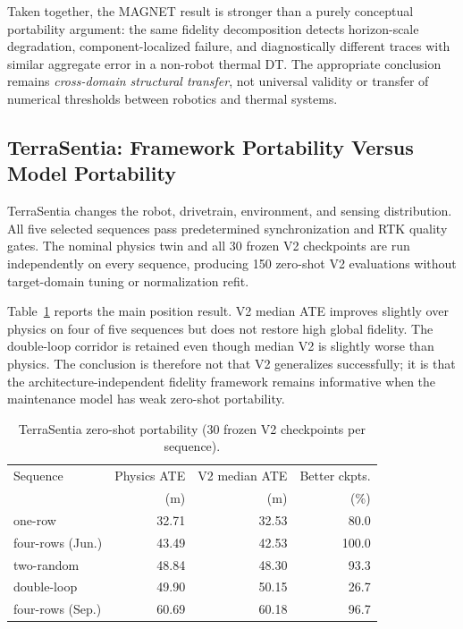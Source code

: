 \documentclass[journal]{IEEEtran}
\begin{document}
Taken together, the MAGNET result is stronger than a purely conceptual portability argument: the same fidelity decomposition detects horizon-scale degradation, component-localized failure, and diagnostically different traces with similar aggregate error in a non-robot thermal DT. The appropriate conclusion remains \emph{cross-domain structural transfer}, not universal validity or transfer of numerical thresholds between robotics and thermal systems.

\subsection{TerraSentia: Framework Portability Versus Model Portability}
TerraSentia changes the robot, drivetrain, environment, and sensing distribution. All five selected sequences pass predetermined synchronization and RTK quality gates. The nominal physics twin and all 30 frozen V2 checkpoints are run independently on every sequence, producing 150 zero-shot V2 evaluations without target-domain tuning or normalization refit.

Table~\ref{tab:terrasentia} reports the main position result. V2 median ATE improves slightly over physics on four of five sequences but does not restore high global fidelity. The double-loop corridor is retained even though median V2 is slightly worse than physics. The conclusion is therefore not that V2 generalizes successfully; it is that the architecture-independent fidelity framework remains informative when the maintenance model has weak zero-shot portability.

\begin{table}[t]
\caption{TerraSentia zero-shot portability (30 frozen V2 checkpoints per sequence).}
\label{tab:terrasentia}
\centering
\scriptsize
\setlength{\tabcolsep}{2.7pt}
\begin{tabular}{lrrr}
\toprule
Sequence & Physics ATE & V2 median ATE & Better ckpts. \\
 & (m) & (m) & (\%) \\
\midrule
one-row & 32.71 & 32.53 & 80.0 \\
four-rows (Jun.) & 43.49 & 42.53 & 100.0 \\
two-random & 48.84 & 48.30 & 93.3 \\
double-loop & 49.90 & 50.15 & 26.7 \\
four-rows (Sep.) & 60.69 & 60.18 & 96.7 \\
\bottomrule
\end{tabular}
\end{table}
\end{document}

